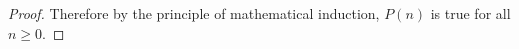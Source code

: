 \documentclass[11pt]{exam}
\begin{document}
\begin{questions}
\begin{solution}
\begin{proof}
    Therefore by the principle of mathematical induction, $P(n)$ is true for all $n \ge 0$.
  \end{proof}

\end{solution}

\end{questions}
\end{document}
